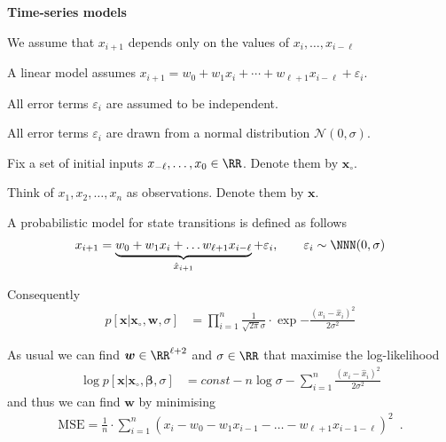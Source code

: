 \documentclass[landscape,footrule]{foils}
\renewcommand{\vec}[1]{\boldsymbol{#1}}
\begin{document}
\titlefoil




\textbf{Time-series models}
\begin{triangles}
\item We assume that $x_{i+1}$ depends only on the values of $x_i, \ldots, x_{i-\ell}$ 
\item A linear model assumes $x_{i+1}=w_0+w_{1}x_i+\cdots+ w_{\ell+1} x_{i-\ell}+\varepsilon_i$.
\item All error terms $\varepsilon_i$ are assumed to be independent.
\item  All error terms $\varepsilon_i$ are drawn from a normal distribution $\mathcal{N}(0,\sigma)$.
\end{triangles}







\begin{triangles}
\item Fix a set of initial inputs $x_{-\ell}, \ldots, x_{0}\in \RR$. Denote them by $\vec{x}_\circ$. 
\item Think of $x_{1},x_{2},\ldots, x_n$ as observations. Denote them by $\vec{x}$.  
\item A probabilistic model for state transitions is defined as follows
\begin{align*}
  x_{i+1}=\underbrace{w_0 +w_1x_i+\ldots w_{\ell+1} x_{i-\ell}}_{\hat{x}_{i+1}}+\varepsilon_i,\qquad \varepsilon_i\sim\NNN(0,\sigma)
\end{align*}
\item Consequently 
\begin{align*}
 p[\vec{x}|\vec{x}_\circ,\vec{w},\sigma]&=\prod_{i=1}^n\frac{1}{\sqrt{2\pi}
    \sigma}\cdot\exp{-\frac{(x_i-\hat{x}_i)^2}{2\sigma^2}}
\end{align*}
\end{triangles}



As usual we can find  $\vec{w}\in \RR^{\ell+2}$ and $\sigma\in\RR$ that maximise the log-likelihood
\begin{align*}
\log p[\vec{x}|\vec{x}_\circ,\vec{\beta},\sigma]&= const -n\log \sigma-\sum_{i=1}^n\frac{(x_i-\hat{x}_i)^2}{2\sigma^2}
\end{align*}
and thus we can find $\vec{w}$ by minimising 
\begin{align*}
\text{MSE}=\frac{1}{n}\cdot \sum_{i=1}^n(x_i-w_0-w_1x_{i-1}-\ldots- w_{\ell+1} x_{i-1-\ell})^2\enspace.
\end{align*}
\end{document}
